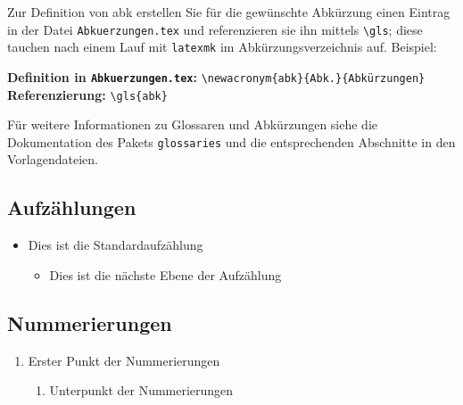 Zur Definition von \gls{abk} erstellen Sie für die gewünschte Abkürzung einen
Eintrag in der Datei \texttt{Abkuerzungen.tex} und referenzieren sie ihn
mittels \texttt{\textbackslash{}gls}; diese tauchen nach einem Lauf mit
\texttt{latexmk} im Abkürzungsverzeichnis auf. Beispiel:

\vspace{-\baselineskip}

\textbf{Definition in \texttt{Abkuerzungen.tex}:} \texttt{\textbackslash{}newacronym\{abk\}\{Abk.\}\{Abkürzungen\}}\\
\textbf{Referenzierung:} \texttt{\textbackslash{}gls\{abk\}}


Für weitere Informationen zu Glossaren und Abkürzungen siehe die Dokumentation
des Pakets \texttt{glossaries} und die entsprechenden Abschnitte in den
Vorlagendateien.


\subsection[]{Aufzählungen}

\begin{itemize}
\item Dies ist die Standardaufzählung
    \begin{itemize}
    \item Dies ist die nächste Ebene der Aufzählung
    \end{itemize}
\end{itemize}


\subsection[]{Nummerierungen}

\begin{enumerate}
\item Erster Punkt der Nummerierungen
    \begin{enumerate}
    \item Unterpunkt der Nummerierungen
    \end{enumerate}
\end{enumerate}
\clearpage
%
\listoffigures %

\printglossary[type=\acronymtype,title=Abkürzungsverzeichnis] %

\listoftables %

\onehalfspacing


